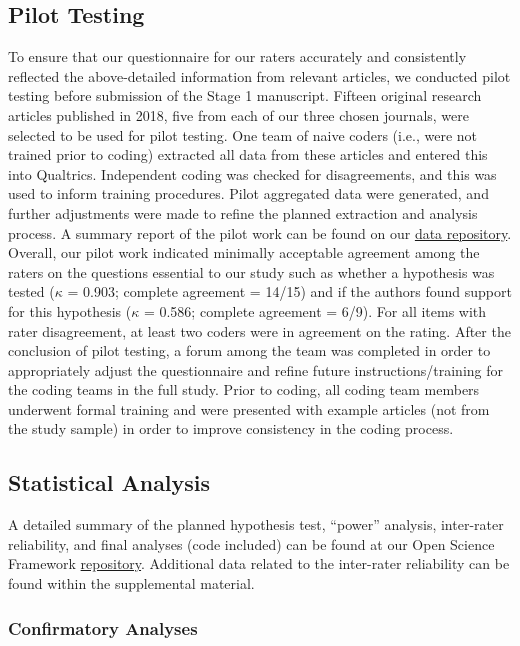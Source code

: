 \documentclass[]{cik}%
\begin{document}
\hypertarget{pilot-testing}{%
\subsection{Pilot Testing}\label{pilot-testing}}

To ensure that our questionnaire for our raters accurately and
consistently reflected the above-detailed information from relevant
articles, we conducted pilot testing before submission of the Stage 1
manuscript. Fifteen original research articles published in 2018, five
from each of our three chosen journals, were selected to be used for
pilot testing. One team of naive coders (i.e., were not trained prior to
coding) extracted all data from these articles and entered this into
Qualtrics. Independent coding was checked for disagreements, and this
was used to inform training procedures. Pilot aggregated data were
generated, and further adjustments were made to refine the planned
extraction and analysis process. A summary report of the pilot work can
be found on our \protect\hyperlink{data}{data repository}. Overall, our
pilot work indicated minimally acceptable agreement among the raters on
the questions essential to our study such as whether a hypothesis was
tested (\(\kappa\) = 0.903; complete agreement = 14/15) and if the
authors found support for this hypothesis (\(\kappa\) = 0.586; complete
agreement = 6/9). For all items with rater disagreement, at least two
coders were in agreement on the rating. After the conclusion of pilot
testing, a forum among the team was completed in order to appropriately
adjust the questionnaire and refine future instructions/training for the
coding teams in the full study. Prior to coding, all coding team members
underwent formal training and were presented with example articles (not
from the study sample) in order to improve consistency in the coding
process.

\hypertarget{statistical-analysis}{%
\subsection{Statistical Analysis}\label{statistical-analysis}}

A detailed summary of the planned hypothesis test, ``power'' analysis,
inter-rater reliability, and final analyses (code included) can be found
at our Open Science Framework \protect\hyperlink{data}{repository}.
Additional data related to the inter-rater reliability can be found
within the supplemental material.

\hypertarget{confirmatory-analyses}{%
\subsubsection{Confirmatory Analyses}\label{confirmatory-analyses}}
\end{document}
